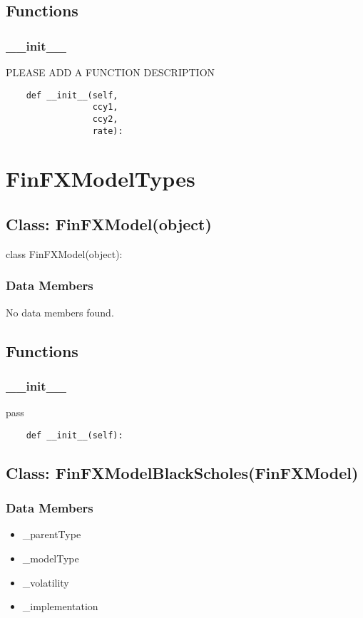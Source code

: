\documentclass[twoside,11pt]{book}
\begin{document}
\subsection*{Functions}

\subsubsection*{{\bf \_\_init\_\_}}
PLEASE ADD A FUNCTION DESCRIPTION

\begin{lstlisting}
    def __init__(self,
                 ccy1,
                 ccy2,
                 rate):
\end{lstlisting}

\newpage
\section{FinFXModelTypes}

\subsection*{Class: FinFXModel(object)}
class FinFXModel(object): 

\subsubsection*{Data Members}
No data members found.

\subsection*{Functions}

\subsubsection*{{\bf \_\_init\_\_}}
pass 

\begin{lstlisting}
    def __init__(self):
\end{lstlisting}

\subsection*{Class: FinFXModelBlackScholes(FinFXModel)}


\subsubsection*{Data Members}
\begin{itemize}
\item{\_parentType}
\item{\_modelType}
\item{\_volatility}
\item{\_implementation}
\end{itemize}
\end{document}
